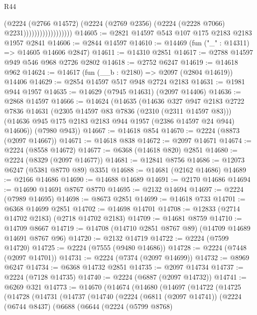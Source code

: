 \begin{lexlean}{R44}
\begin{coremodule}
                                  (@2224
                                    (@2766 @14572)
                                    (@2224
                                      (@2769 @2356)
                                      (@2224 (@2228 @7066) @2231))))))))))))))))))
@14605 := @2821 @14597 @543 @107 @175 @2183 @2183 @1957 @2841
@14606 := @2844 @14597
@14610 := @14469 (fun ("_" : @14311) => @14605 @14606 @2847)
@14611 := @14310 @2851
@14617 := @2788 @14597 @949 @546 @968 @2726 @2802
@14618 := @2752 @6247
@14619 := @14618 @962
@14624 := @14617 (fun (__b : @2180) => @2097 (@2804 @14619)) @14406
@14629 := @2854 @14597 @517 @948 @2724 @2183
@14631 := @1981 @944 @1957
@14635 := @14629 (@7945 @14631) (@2097 @14406)
@14636 := @2868 @14597
@14666 := @14624
    (@14635
      (@14636
        @327
        @947
        @2183
        @2722
        @7836
        @14631
        (@2305 @14597 @83 @7836 (@2310 (@2311 @14597 @83)))
        (@14636 @945 @175 @2183 @2183 @944 @1957 (@2386 @14597 @24 @944) @14606))
      (@7980 @943))
@14667 := @14618 @854
@14670 := @2224 (@8873 (@2097 @14667))
@14671 := @14618 @838
@14672 := @2097 @14671
@14674 := @2224 (@8558 @14672)
@14677 := @6368 (@14618 @820) @2851
@14680 := @2224 (@8329 (@2097 @14677))
@14681 := @12841 @8756
@14686 := @12073 @6247 (@5381 @8770 @89) @3351
@14688 := @14681 (@2162 @14686)
@14689 := @2166 @14686
@14690 := @14688 @14689
@14691 := @2170 @14686
@14694 := @14690 @14691 @8767 @8770
@14695 := @2132 @14694
@14697 := @2224 (@7989 @14695)
@14698 := @8673 @2851
@14699 := @14618 @733
@14701 := @6368 @14699 @2851
@14702 := @14698 @14701
@14708 := @12833 (@2714 @14702 @2183) (@2718 @14702 @2183)
@14709 := @14681 @8759
@14710 := @14709 @8667
@14719 := @14708 (@14710 @2851 @8767 @89) (@14709 @14689 @14691 @8767 @96)
@14720 := @2132 @14719
@14722 := @2224 (@7599 @14720)
@14725 := @2224 (@7555 (@9480 @14686))
@14728 := @2224 (@7448 (@2097 @14701))
@14731 := @2224 (@7374 (@2097 @14699))
@14732 := @8969 @6247
@14734 := @6368 @14732 @2851
@14735 := @2097 @14734
@14737 := @2224 (@7128 @14735)
@14740 := @2224 (@6887 (@2097 @14732))
@14741 := @6269 @321
@14773 := @14670
    (@14674
      (@14680
        (@14697
          (@14722
            (@14725
              (@14728
                (@14731
                  (@14737
                    (@14740
                      (@2224
                        (@6811 (@2097 @14741))
                        (@2224
                          (@6744 @8437)
                          (@6688
                            (@6644
                              (@2224
                                (@5799 @8768)

\end{coremodule}
\end{lexlean}
